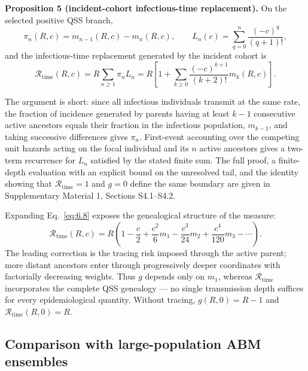 \documentclass[review,12pt]{elsarticle}
\numberwithin{equation}{section}
\theoremstyle{remark}
\begin{document}
\textbf{Proposition 5 (incident-cohort infectious-time replacement).} On the selected positive QSS branch,
\begin{equation}
\pi_n(R,c) = m_{n-1}(R,c) - m_n(R,c), \qquad
L_n(c) = \sum_{q=0}^{n} \frac{(-c)^q}{(q+1)!},
\label{eq:6.5}
\end{equation}
and the infectious-time replacement generated by the incident cohort is
\begin{equation}
\mathcal R_{\mathrm{time}}(R,c) = R\sum_{n\geq1}\pi_n L_n
= R\left[1+\sum_{k\geq0}\frac{(-c)^{k+1}}{(k+2)!}m_k(R,c)\right].
\label{eq:6.8}
\end{equation}

The argument is short: since all infectious individuals transmit at the same rate, the fraction of incidence generated by parents having at least $k-1$ consecutive active ancestors equals their fraction in the infectious population, $m_{k-1}$, and taking successive differences gives $\pi_n$. First-event accounting over the competing unit hazards acting on the focal individual and its $n$ active ancestors gives a two-term recurrence for $L_n$ satisfied by the stated finite sum. The full proof, a finite-depth evaluation with an explicit bound on the unresolved tail, and the identity showing that $\mathcal R_{\mathrm{time}}=1$ and $g=0$ define the same boundary are given in Supplementary Material 1, Sections S4.1--S4.2.

Expanding Eq.~\eqref{eq:6.8} exposes the genealogical structure of the measure:
\begin{equation}
\mathcal R_{\mathrm{time}}(R,c) = R\left(1-\frac{c}{2}+\frac{c^2}{6}m_1-\frac{c^3}{24}m_2+\frac{c^4}{120}m_3-\cdots\right).
\label{eq:6.11}
\end{equation}
The leading correction is the tracing risk imposed through the active parent; more distant ancestors enter through progressively deeper coordinates with factorially decreasing weights. Thus $g$ depends only on $m_1$, whereas $\mathcal R_{\mathrm{time}}$ incorporates the complete QSS genealogy --- no single transmission depth suffices for every epidemiological quantity. Without tracing, $g(R,0)=R-1$ and $\mathcal R_{\mathrm{time}}(R,0)=R$.

\subsection{Comparison with large-population ABM ensembles}\label{subsec4.2}
\end{document}
